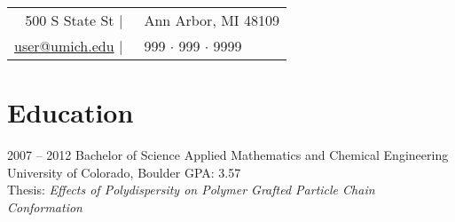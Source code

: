 \documentclass[]{template-cv} %
\begin{document}
\vspace{-0.4cm}
\begin{center}%
\begin{tabular}[tc]{r l}
    500 S State St  $|$ & \
    Ann Arbor, MI 48109 \\
    \href{mailto:user@umich.edu}{user@umich.edu} $|$ & \
    999 $\cdot$ 999 $\cdot$ 9999  \\
\end{tabular}
\end{center}

\section{Education}
\begin{entrylist}
\entry
{2007 -- 2012}
{Bachelor of Science {\normalfont  Applied Mathematics and Chemical Engineering}}
{University of Colorado, Boulder}
{GPA: 3.57 \\
Thesis: \emph{Effects of Polydispersity on Polymer Grafted Particle Chain Conformation}}
\end{entrylist}
\end{document}
